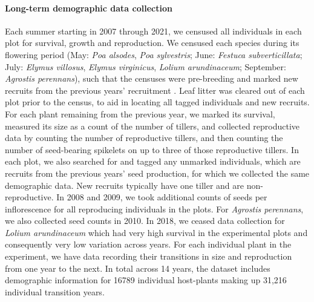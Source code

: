 \documentclass[12pt]{article}
\begin{document}
\paragraph*{Long-term demographic data collection}
Each summer starting in 2007 through 2021, we censused all individuals in each plot for survival, growth and reproduction. 
We censused each species during its flowering period (May: \emph{Poa alsodes}, \emph{Poa sylvestris}; June: \emph{Festuca subverticillata}; July: \emph{Elymus villosus}, \emph{Elymus virginicus}, \emph{Lolium arundinaceum}; September: \emph{Agrostis perennans}), such that the censuses were pre-breeding and marked new recruits from the previous years' recruitment .
Leaf litter was cleared out of each plot prior to the census, to aid in locating all tagged individuals and new recruits.
For each plant remaining from the previous year, we marked its survival, measured its size as a count of the number of tillers, and collected reproductive data by counting the number of reproductive tillers, and then counting the number of seed-bearing spikelets on up to three of those reproductive tillers. 
In each plot, we also searched for and tagged any unmarked individuals, which are recruits from the previous years' seed production, for which we collected the same demographic data.
New recruits typically have one tiller and are non-reproductive. 
In 2008 and 2009, we took additional counts of seeds per inflorescence for all reproducing individuals in the plots. 
For \emph{Agrostis perennans}, we also collected seed counts in 2010.
In 2018, we ceased data collection  for \emph{Lolium arundinaceum} which had very high survival in the experimental plots and consequently very low variation across years.
For each individual plant in the experiment, we have data recording their transitions in size and reproduction from one year to the next. 
In total across 14 years, the dataset includes demographic information for 16789 individual host-plants making up 31,216 individual transition years.
\end{document}
